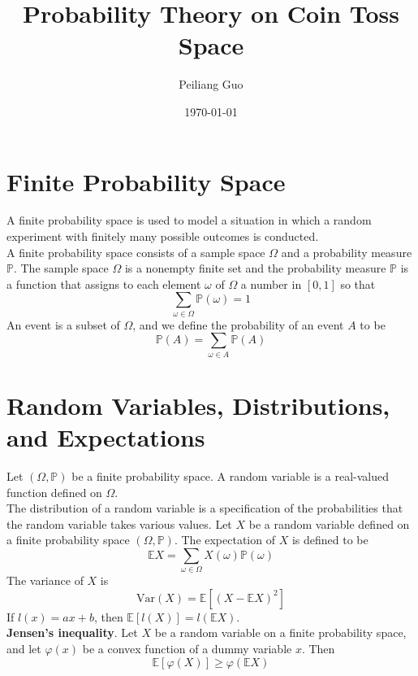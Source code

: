 \documentclass[a4paper]{article}
\title{Probability Theory on Coin Toss Space}
\author{Peiliang Guo}
\date{\today}
\begin{document}
\maketitle
\section{Finite Probability Space}
A finite probability space is used to model a situation in which a random experiment with finitely many possible outcomes is conducted. \\
A finite probability space consists of a sample space $\Omega$ and a probability measure $\mathbb{P}$. The sample space $\Omega$ is a nonempty finite set and the probability measure $\mathbb{P}$ is a function that assigns to each element $\omega$ of $\Omega$ a number in $[0,1]$ so that
$$\sum_{\omega\in\Omega}\mathbb{P}(\omega) = 1$$
An event is a subset of $\Omega$, and we define the probability of an event $A$ to be 
$$\mathbb{P}(A)=\sum_{\omega\in A}\mathbb{P}(A)$$
\section{Random Variables, Distributions, and Expectations}
Let $(\Omega,\mathbb{P})$ be a finite probability space. A random variable is a real-valued function defined on $\Omega$.\\
The distribution of a random variable is a specification of the probabilities that the random variable takes various values.
Let $X$ be a random variable defined on a finite probability space $(\Omega,\mathbb{P})$. The expectation of $X$ is defined to be
$$\mathbb{E}X=\sum_{\omega\in\Omega}X(\omega)\mathbb{P}(\omega)$$
The variance of $X$ is 
$$\mathrm{Var}(X)=\mathbb{E}\left[(X-\mathbb{E}X)^2\right]$$
If $l(x) = ax+b$, then $\mathbb{E}[l(X)]=l(\mathbb{E}X)$. \\
\textbf{Jensen's inequality}. Let $X$ be a random variable on a finite probability space, and let $\varphi(x)$ be a convex function of a dummy variable $x$. Then
$$\mathbb{E}[\varphi(X)]\ge \varphi(\mathbb{E} X)$$
\end{document}
